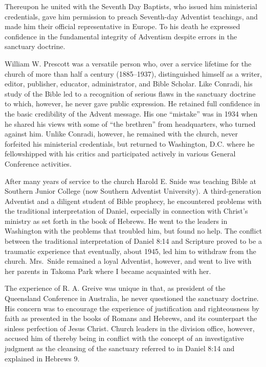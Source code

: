 Thereupon he united with the Seventh Day Baptists, who issued him
ministerial credentials, gave him permission to preach Seventh-day Adventist
teachings, and made him their official representative in Europe. To his 
death he expressed confidence in the fundamental integrity of Adventism
despite errors in the sanctuary doctrine.

William W. Prescott was a versatile person who, over a service lifetime for
the church of more than half a century (1885--1937), distinguished himself as
a writer, editor, publisher, educator, administrator, and Bible Scholar.
Like Conradi, his study of the Bible led to a recognition of serious flaws
in the sanctuary doctrine to which, however, he never gave public
expression. He retained full confidence in the basic credibility of the
Advent message. His one ``mistake'' was in 1934 when he shared his views with
some of ``the brethren'' from headquarters, who turned against him. Unlike
Conradi, however, he remained with the church, never forfeited his
ministerial credentials, but returned to Washington, D.C. where he
fellowshipped with his critics and participated actively in various General
Conference activities.

After many years of service to the church Harold E. Snide was teaching Bible
at Southern Junior College (now Southern Adventist University). A
third-generation Adventist and a diligent student of Bible prophecy, he
encountered problems with the traditional interpretation of Daniel,
especially in connection with Christ's ministry as set forth in the book of
Hebrews. He went to the leaders in Washington with the problems that
troubled him, but found no help. The conflict between the traditional
interpretation of Daniel 8:14 and Scripture proved to be a traumatic
experience that eventually, about 1945, led him to withdraw from the church.
Mrs.\ Snide remained a loyal Adventist, however, and went to live with her
parents in Takoma Park where I became acquainted with her. 

The experience of R. A. Greive was unique in that, as president of the
Queensland Conference in Australia, he never questioned the sanctuary
doctrine. His concern was to encourage the experience of justification and
righteousness by faith as presented in the books of Romans and Hebrews, and
its counterpart the sinless perfection of Jesus Christ. Church leaders in
the division office, however, accused him of thereby being in conflict with
the concept of an investigative judgment as the cleansing of the sanctuary
referred to in Daniel 8:14 and explained in Hebrews 9.

